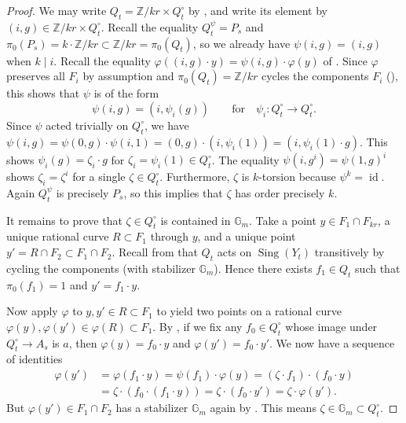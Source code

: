 \documentclass[10pt,a4paper]{amsart}
\newcommand{\GG}{\mathbb{G}}
\DeclareMathOperator{\Sing}{Sing}
\newcommand{\ZZ}{\mathbb{Z}}
\DeclareMathOperator{\id}{id}
\begin{document}
			\begin{proof}
				We may write $Q_t = \ZZ/kr \times Q_t^\circ$ by , and write its element by $(i, g) \in \ZZ/kr \times Q_t^\circ$. Recall the equality $Q_t^\psi = P_s$ and $\pi_0(P_s) = k \cdot \ZZ/kr \subset \ZZ/kr = \pi_0(Q_t)$, so we already have $\psi(i,g) = (i,g)$ when $k \mid i$. Recall the equality $\varphi ((i,g) \cdot y) = \psi(i,g) \cdot \varphi(y)$ of . Since $\varphi$ preserves all $F_i$ by assumption and $\pi_0(Q_t) = \ZZ/kr$ cycles the components $F_i$ (), this shows that $\psi$ is of the form
				\[ \psi(i,g) = (i, \psi_i (g)) \qquad\mbox{for}\quad \psi_i : Q_t^\circ \to Q_t^\circ .\]
				Since $\psi$ acted trivially on $Q_t^\circ$, we have $\psi(i,g) = \psi(0,g) \cdot \psi(i,1) = (0,g) \cdot (i,\psi_i(1)) = (i, \psi_i(1) \cdot g)$. This shows $\psi_i(g) = \zeta_i \cdot g$ for $\zeta_i = \psi_i(1) \in Q_t^\circ$. The equality $\psi(i,g^i) = \psi(1, g)^i$ shows $\zeta_i = \zeta^i$ for a single $\zeta \in Q_t^\circ$. Furthermore, $\zeta$ is $k$-torsion because $\psi^k = \id$. Again $Q_t^\psi$ is precisely $P_s$, so this implies that $\zeta$ has order precisely $k$.
				
				\medskip
				
				It remains to prove that $\zeta \in Q_t^\circ$ is contained in $\GG_m$. Take a point $y \in F_1 \cap F_{kr}$, a unique rational curve $R \subset F_1$ through $y$, and a unique point $y' = R \cap F_2 \subset F_1 \cap F_2$. Recall from  that $Q_t$ acts on $\Sing(Y_t)$ transitively by cycling the components (with stabilizer $\GG_m$). Hence there exists $f_1 \in Q_t$ such that $\pi_0(f_1) = 1$ and $y' = f_1 \cdot y$.
				
				Now apply $\varphi$ to $y, y' \in R \subset F_1$ to yield two points on a rational curve $\varphi(y), \varphi(y') \in \varphi(R) \subset F_1$. By , if we fix any $f_0 \in Q_t^\circ$ whose image under $Q_t^\circ \to A_s$ is $a$, then $\varphi(y) = f_0 \cdot y$ and $\varphi(y') = f_0 \cdot y'$. We now have a sequence of identities
				\begin{align*}
					\varphi(y') &= \varphi(f_1 \cdot y) = \psi(f_1) \cdot \varphi(y) = (\zeta \cdot f_1) \cdot (f_0 \cdot y) \\
					&= \zeta \cdot (f_0 \cdot (f_1 \cdot y)) = \zeta \cdot (f_0 \cdot y') = \zeta \cdot \varphi(y') .
				\end{align*}
				But $\varphi(y') \in F_1 \cap F_2$ has a stabilizer $\GG_m$ again by . This means $\zeta \in \GG_m \subset Q_t^\circ$.
			\end{proof}
\end{document}
